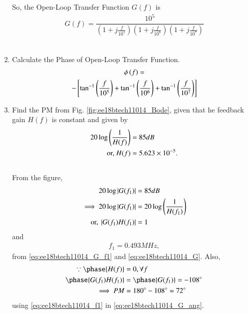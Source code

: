 \begin{enumerate}[label=\thesection.\arabic*.,ref=\thesection.\theenumi]
So, the Open-Loop Transfer Function $G(f)$ is
\begin{align}
\label{eq:ee18btech11014_G}
	G(f) = \dfrac{10^{5}}{\left(1+j\frac{f}{10^{5}}\right)\left(1+j\frac{f}{10^{6}}\right)\left(1+j\frac{f}{10^{7}}\right)}
\end{align}\\
\item Calculate the Phase of Open-Loop Transfer Function.\\
\solution
%
\begin{multline}
\label{eq:ee18btech11014_G_ang}
\phi\left(f\right) =
\\
-{}\left[\tan ^{-1}\left(\frac{f}{10^{5}}\right)+\tan ^{-1}\left(\frac{f}{10^{6}}\right)+\tan ^{-1}\left(\frac{f}{10^{7}}\right)\right]
\end{multline}
\item Find the PM from  Fig. 	\ref{fig:ee18btech11014_Bode}, given that he feedback gain $H(f)$ is constant and given by 
\begin{align}
20 \log \left(\frac{1}{H(f) }\right) &= 85 dB
\\
\text{or, } H(f) &= 5.623 \times 10^{-5}.
\end{align}
\\
\solution From the figure, 
\begin{align}
\label{eq:ee18btech11014_G_f1}
20 \log \left\vert G(f_1)\right\vert &= 85 dB
\\
\implies 20 \log \left\vert G(f_1)\right\vert & = 20 \log \left(\frac{1}{H(f_1) }\right)
\\
\text{or, } \left\vert G(f_1)H(f_1)\right\vert &= 1
\end{align}
and 
\begin{align}
\label{eq:ee18btech11014_f1}
f_1 = 0.493 MHz, 
\end{align}
from \eqref{eq:ee18btech11014_G_f1} and \eqref{eq:ee18btech11014_G}.
Also,
%
\begin{align}
\because \phase{H(f)} &= 0, \forall f
\\
\phase{G(f_1)H(f_1)} &= \phase{G(f_1)} = -108 \degree
\\
\implies PM &= 180 \degree - 108 \degree = 72 \degree
\end{align}
using \eqref{eq:ee18btech11014_f1} in \eqref{eq:ee18btech11014_G_ang}.


\end{enumerate}

